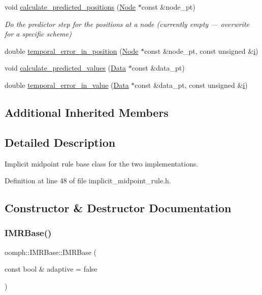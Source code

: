 \begin{DoxyCompactItemize}
void \hyperlink{classoomph_1_1IMRBase_ac206f72b8054828b715756417dcd230a}{calculate\+\_\+predicted\+\_\+positions} (\hyperlink{classoomph_1_1Node}{Node} $\ast$const \&node\+\_\+pt)
\begin{DoxyCompactList}\small\item\em Do the predictor step for the positions at a node (currently empty --- overwrite for a specific scheme) \end{DoxyCompactList}\item 
double \hyperlink{classoomph_1_1IMRBase_a6e57fd5364c261cd7c1bd49688899a13}{temporal\+\_\+error\+\_\+in\+\_\+position} (\hyperlink{classoomph_1_1Node}{Node} $\ast$const \&node\+\_\+pt, const unsigned \&\hyperlink{cfortran_8h_adb50e893b86b3e55e751a42eab3cba82}{i})
\item 
void \hyperlink{classoomph_1_1IMRBase_a1512b1a47e5b6dc6c8540fd024c44d1d}{calculate\+\_\+predicted\+\_\+values} (\hyperlink{classoomph_1_1Data}{Data} $\ast$const \&data\+\_\+pt)
\item 
double \hyperlink{classoomph_1_1IMRBase_aa51711d15be423119178f2b0c5ec8097}{temporal\+\_\+error\+\_\+in\+\_\+value} (\hyperlink{classoomph_1_1Data}{Data} $\ast$const \&data\+\_\+pt, const unsigned \&\hyperlink{cfortran_8h_adb50e893b86b3e55e751a42eab3cba82}{i})
\end{DoxyCompactItemize}
\subsection*{Additional Inherited Members}


\subsection{Detailed Description}
Implicit midpoint rule base class for the two implementations. 

Definition at line 48 of file implicit\+\_\+midpoint\+\_\+rule.\+h.



\subsection{Constructor \& Destructor Documentation}
\mbox{\label{classoomph_1_1IMRBase_af0cee00bd97a2f6d8bafdb9f965a9982}} 
\subsubsection{\texorpdfstring{I\+M\+R\+Base()}{IMRBase()}}
{\footnotesize\ttfamily oomph\+::\+I\+M\+R\+Base\+::\+I\+M\+R\+Base (\begin{DoxyParamCaption}\item[{const bool \&}]{adaptive = {\ttfamily false} }\end{DoxyParamCaption})\hspace{0.3cm}{\ttfamily [inline]}}



